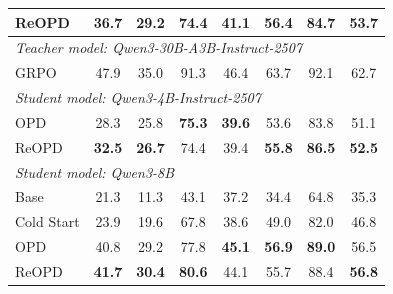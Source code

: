 \begin{table}[t]
\begin{tabular}{lccccccc}
            \rowcolor{myblue}
            ReOPD & \textbf{36.7} & \textbf{29.2} & \textbf{74.4} & \textbf{41.1} & \textbf{56.4} & 84.7 & \textbf{53.7} \\
        \midrule
        \midrule
            \multicolumn{8}{l}{\textit{Teacher model: Qwen3-30B-A3B-Instruct-2507}} \\
            GRPO & 47.9 & 35.0 & 91.3 & 46.4 & 63.7 & 92.1 & 62.7 \\
        \cmidrule(lr){1-8} 
            \multicolumn{8}{l}{\textit{Student model: Qwen3-4B-Instruct-2507}} \\
            OPD & 28.3 & 25.8 & \textbf{75.3} & \textbf{39.6} & 53.6 & 83.8 & 51.1 \\
            \rowcolor{myblue}
            ReOPD & \textbf{32.5} & \textbf{26.7} & 74.4 & 39.4 & \textbf{55.8} & \textbf{86.5} & \textbf{52.5} \\
        \cmidrule(lr){1-8} 
            \multicolumn{8}{l}{\textit{Student model: Qwen3-8B}} \\
            Base & 21.3 & 11.3 & 43.1 & 37.2 & 34.4 & 64.8 & 35.3 \\
            Cold Start & 23.9 & 19.6 & 67.8 & 38.6 & 49.0 & 82.0 & 46.8 \\
            OPD & 40.8 & 29.2 & 77.8 & \textbf{45.1} & \textbf{56.9} & \textbf{89.0} & 56.5 \\
            \rowcolor{myblue}
            ReOPD & \textbf{41.7} & \textbf{30.4} & \textbf{80.6} & 44.1 & 55.7 & 88.4 & \textbf{56.8} \\
        \bottomrule
    \end{tabular}
\end{table}



